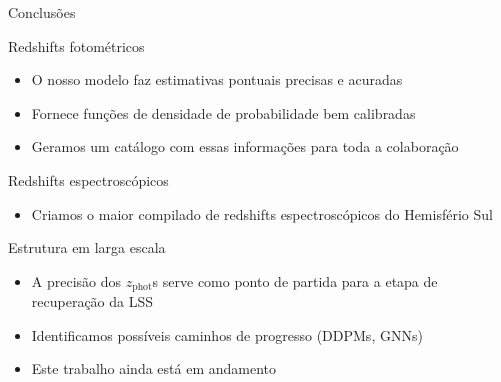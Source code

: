 
\begin{frame}[c]{Conclusões}
    \small
    \vspace*{0.2cm}
    \begin{splusbox}{Redshifts fotométricos}
        \begin{itemize}
            \setlength\itemsep{.1em}
            \item O nosso modelo faz estimativas pontuais precisas e acuradas
            \item Fornece funções de densidade de probabilidade bem calibradas
            \item Geramos um catálogo com essas informações para toda a colaboração
        \end{itemize}
    \end{splusbox}
    
    \begin{splusbox}{Redshifts espectroscópicos}
        \begin{itemize}
            \setlength\itemsep{.1em}
            \item Criamos o maior compilado de redshifts espectroscópicos do Hemisfério Sul
        \end{itemize}
    \end{splusbox}

    \begin{splusbox}{Estrutura em larga escala}
        \begin{itemize}
            \setlength\itemsep{.1em}
            \item A precisão dos $z_\text{phot}$s serve como ponto de partida para a etapa de recuperação da LSS
            \item Identificamos possíveis caminhos de progresso (DDPMs, GNNs)
            \item Este trabalho ainda está em andamento
        \end{itemize}
    \end{splusbox}
\end{frame}

